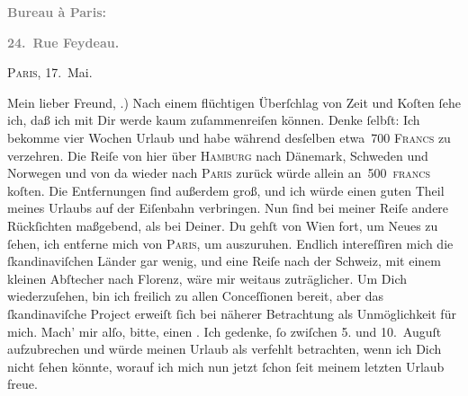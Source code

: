 \pstart
           \begin{otherlanguage}{french}\textcolor{gray}{\textbf{\textbf{Bureau à Paris:}}}\end{otherlanguage}\pend
           
\pstart
           \begin{otherlanguage}{french}\textcolor{gray}{\textbf{\textbf{24. Rue Feydeau.}}}\end{otherlanguage}\hfill \textsc{Paris}, 17. Mai.\pend
           
\pstart\center{}Mein lieber Freund,\pend\vspace{0.5em}
.) Nach einem flüchtigen Überſchlag von Zeit und Koſten ſehe ich, daß ich mit Dir
               werde kaum zuſammenreiſen können. Denke ſelbſt: Ich bekomme vier Wochen Urlaub und
               habe während desſelben etwa 700 \textsc{Francs} zu verzehren. Die
               Reiſe von hier über \textsc{Hamburg} nach Dänemark, Schweden und Norwegen und von da wieder nach \textsc{Paris} zurück würde allein an 500 \textsc{francs} koſten. Die
               Entfernungen {\pb}ſind außerdem groß, und ich würde
               einen guten Theil meines Urlaubs auf der Eiſenbahn verbringen. Nun ſind bei meiner
               Reiſe andere Rückſichten maßgebend, als bei Deiner. Du gehſt von Wien fort, um Neues zu ſehen, ich entferne mich von \textsc{Paris}, um auszuruhen. Endlich intereſſiren mich die ſkandinaviſchen Länder gar wenig, und eine Reiſe nach der Schweiz, mit einem kleinen Abſtecher nach Florenz, wäre mir weitaus zuträglicher. Um Dich wiederzuſehen,
               bin ich freilich zu allen Conceſſionen {\pb}bereit, aber
               das ſkandinaviſche Project erweiſt ſich bei näherer Betrachtung als
               Unmöglichkeit für mich. Mach’ mir alſo, bitte, einen \label{K_L02774-1v}\label{K_L02774-1}. Ich gedenke, ſo zwiſchen 5. und 10. Auguſt aufzubrechen und würde meinen Urlaub als
               verfehlt betrachten, wenn ich Dich nicht ſehen könnte, worauf ich mich nun jetzt
               ſchon ſeit meinem letzten Urlaub freue.\pend
           
